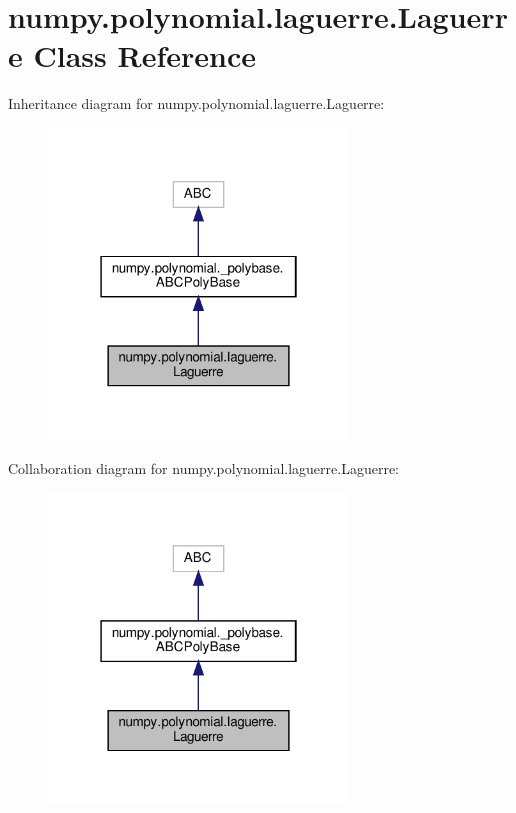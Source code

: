 \hypertarget{classnumpy_1_1polynomial_1_1laguerre_1_1Laguerre}{}\section{numpy.\+polynomial.\+laguerre.\+Laguerre Class Reference}
\label{classnumpy_1_1polynomial_1_1laguerre_1_1Laguerre}


Inheritance diagram for numpy.\+polynomial.\+laguerre.\+Laguerre\+:
\nopagebreak
\begin{figure}[H]
\begin{center}
\leavevmode
\includegraphics[width=226pt]{classnumpy_1_1polynomial_1_1laguerre_1_1Laguerre__inherit__graph}
\end{center}
\end{figure}


Collaboration diagram for numpy.\+polynomial.\+laguerre.\+Laguerre\+:
\nopagebreak
\begin{figure}[H]
\begin{center}
\leavevmode
\includegraphics[width=226pt]{classnumpy_1_1polynomial_1_1laguerre_1_1Laguerre__coll__graph}
\end{center}
\end{figure}

